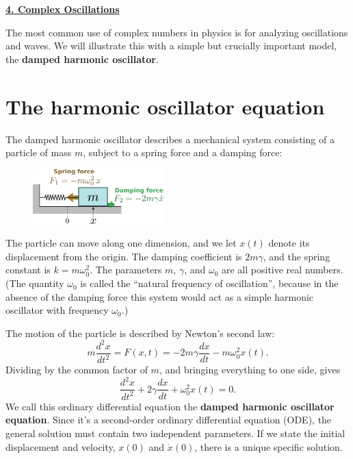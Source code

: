 \documentclass[10pt,a4paper]{article}
\begin{document}
\setcounter{page}{27}
\noindent
\underline{\textbf{\LARGE 4. Complex Oscillations}}
\vskip 0.1in

The most common use of complex numbers in physics is for analyzing
oscillations and waves. We will illustrate this with a simple but
crucially important model, the \textbf{damped harmonic oscillator}.

\section{The harmonic oscillator equation}
\label{the-harmonic-oscillator-equation}

The damped harmonic oscillator describes a mechanical system consisting
of a particle of mass $m$, subject to a spring force and a damping
force:

\begin{figure}[h]
  \centering\includegraphics[width=0.45\textwidth]{oscillator}
\end{figure}
\noindent
The particle can move along one dimension, and we let $x(t)$ denote
its displacement from the origin. The damping coefficient is $2m
\gamma$, and the spring constant is $k = m\omega_0^2$. The parameters
$m$, $\gamma$, and $\omega_0$ are all positive real numbers. (The
quantity $\omega_0$ is called the ``natural frequency of
oscillation'', because in the absence of the damping force this system
would act as a simple harmonic oscillator with frequency $\omega_0$.)

The motion of the particle is described by Newton's second law:
\begin{equation}
  m \frac{d^2 x}{dt^2} = F(x,t) = - 2m\gamma \frac{dx}{dt} - m\omega_0^2 x(t).
\end{equation}
Dividing by the common factor of $m$, and bringing everything to one
side, gives
\begin{equation}
  \frac{d^2 x}{dt^2} + 2\gamma \frac{dx}{dt} + \omega_0^2 x(t) = 0.
\end{equation}
We call this ordinary differential equation the \textbf{damped
  harmonic oscillator equation}. Since it's a second-order ordinary
differential equation (ODE), the general solution must contain two
independent parameters. If we state the initial displacement and
velocity, $x(0)$ and $\dot{x}(0)$, there is a unique specific
solution.
\end{document}
